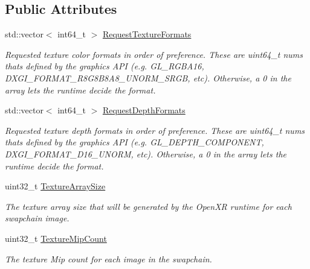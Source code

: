 \subsection*{Public Attributes}
\begin{DoxyCompactItemize}
\item 
std\+::vector$<$ int64\+\_\+t $>$ \mbox{\hyperlink{struct_open_x_r_provider_1_1_x_r_render_info_a84860b74dcb11fbc7494883b555f3029}{Request\+Texture\+Formats}}
\begin{DoxyCompactList}\small\item\em Requested texture color formats in order of preference. These are uint64\+\_\+t nums that\textquotesingle{}s defined by the graphics A\+PI (e.\+g. G\+L\+\_\+\+R\+G\+B\+A16, D\+X\+G\+I\+\_\+\+F\+O\+R\+M\+A\+T\+\_\+\+R8\+G8\+B8\+A8\+\_\+\+U\+N\+O\+R\+M\+\_\+\+S\+R\+GB, etc). Otherwise, a 0 in the array lets the runtime decide the format. \end{DoxyCompactList}\item 
std\+::vector$<$ int64\+\_\+t $>$ \mbox{\hyperlink{struct_open_x_r_provider_1_1_x_r_render_info_aa4ba2f324a4ae14f1e51f2343dd1446b}{Request\+Depth\+Formats}}
\begin{DoxyCompactList}\small\item\em Requested texture depth formats in order of preference. These are uint64\+\_\+t nums that\textquotesingle{}s defined by the graphics A\+PI (e.\+g. G\+L\+\_\+\+D\+E\+P\+T\+H\+\_\+\+C\+O\+M\+P\+O\+N\+E\+NT, D\+X\+G\+I\+\_\+\+F\+O\+R\+M\+A\+T\+\_\+\+D16\+\_\+\+U\+N\+O\+RM, etc). Otherwise, a 0 in the array lets the runtime decide the format. \end{DoxyCompactList}\item 
uint32\+\_\+t \mbox{\hyperlink{struct_open_x_r_provider_1_1_x_r_render_info_a9bf5bd224350b3fcc79a1643b8cc85f6}{Texture\+Array\+Size}}
\begin{DoxyCompactList}\small\item\em The texture array size that will be generated by the Open\+XR runtime for each swapchain image. \end{DoxyCompactList}\item 
uint32\+\_\+t \mbox{\hyperlink{struct_open_x_r_provider_1_1_x_r_render_info_ad86a33b90d0f38aa11a3cd4e0dc521b4}{Texture\+Mip\+Count}}
\begin{DoxyCompactList}\small\item\em The texture Mip count for each image in the swapchain. \end{DoxyCompactList}\end{DoxyCompactItemize}


